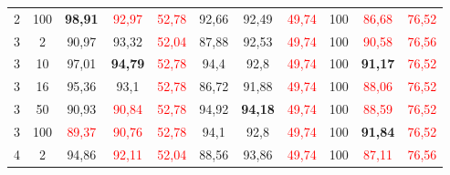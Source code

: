\begin{table}[ht]
\begin{tabular}{cc|ccc|ccc|ccc}
        {2}                           & {100}   & \textbf{98,91}                      & \textcolor{red}{92,97}              & \textcolor{red}{52,78}                   & {92,66}                         & {92,49}                         & \textcolor{red}{49,74}         & {100}                           & \textcolor{red}{86,68}          & \textcolor{red}{76,52}         \\
        {3}                           & {2}     & {90,97}                             & {93,32}                             & \textcolor{red}{52,04}                   & {87,88}                         & {92,53}                         & \textcolor{red}{49,74}         & {100}                           & \textcolor{red}{90,58}          & \textcolor{red}{76,56}         \\
        {3}                           & {10}    & {97,01}                             & \textbf{{94,79}}                    & \textcolor{red}{52,78}                   & {94,4}                          & {92,8}                          & \textcolor{red}{49,74}         & {100}                           & \textbf{91,17}                  & \textcolor{red}{76,52}         \\
        {3}                           & {16}    & {95,36}                             & {93,1}                              & \textcolor{red}{52,78}                   & {86,72}                         & {91,88}                         & \textcolor{red}{49,74}         & {100}                           & \textcolor{red}{88,06}          & \textcolor{red}{76,52}         \\
        {3}                           & {50}    & {90,93}                             & \textcolor{red}{90,84}              & \textcolor{red}{52,78}                   & {94,92}                         & \textbf{94,18}                  & \textcolor{red}{49,74}         & {100}                           & \textcolor{red}{88,59}          & \textcolor{red}{76,52}         \\
        {3}                           & {100}   & \textcolor{red}{89,37}              & \textcolor{red}{90,76}              & \textcolor{red}{52,78}                   & {94,1}                          & {92,8}                          & \textcolor{red}{49,74}         & {100}                           & \textbf{91,84}                  & \textcolor{red}{76,52}         \\
        {4}                           & {2}     & {94,86}                             & \textcolor{red}{92,11}              & \textcolor{red}{52,04}                   & {88,56}                         & {93,86}                         & \textcolor{red}{49,74}         & {100}                           & \textcolor{red}{87,11}          & \textcolor{red}{76,56}         \\

\end{tabular}
\end{table}
